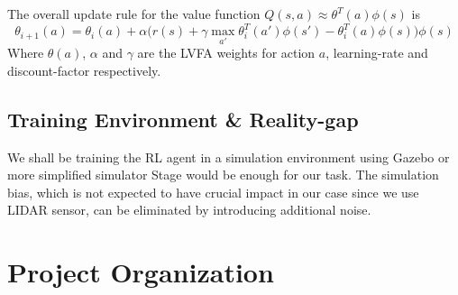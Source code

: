 \documentclass{article}
\begin{document}
The overall update rule for the value function $Q(s, a) \approx \theta^T(a)\phi(s)$ is%
\begin{equation*}
\theta_{i+1}(a) = \theta_i(a) + \alpha\Big( r(s) + \gamma \max_{a'} \theta_{i}^{T}(a')\phi(s') - \theta_{i}^{T}(a) \phi(s) \Big) \phi(s)
\end{equation*}
Where $\theta(a)$, $\alpha$ and $\gamma$ are the LVFA weights for action $a$, learning-rate and discount-factor respectively.

%
\subsection{Training Environment \& Reality-gap}
We shall be training the RL agent in a simulation environment using Gazebo or more simplified simulator Stage would be enough for our task. The simulation bias, which is not expected to have crucial impact in our case since we use LIDAR sensor, can be eliminated by introducing additional noise.

\section{Project Organization}
\end{document}
